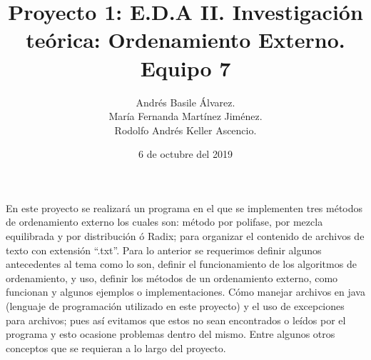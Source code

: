 \documentclass[12pt,letterpaper]{report}
\author{Andrés Basile Álvarez.\\María Fernanda Martínez Jiménez.\\Rodolfo Andrés Keller Ascencio.}
\title{Proyecto 1: E.D.A II.
Investigación teórica: Ordenamiento Externo. Equipo 7}
\date{6 de octubre del 2019}
\begin{document}
\maketitle
En este proyecto se realizará un programa en el que se implementen tres métodos de ordenamiento externo los cuales son: método por polifase, por mezcla equilibrada y por distribución ó Radix; para organizar el contenido de archivos de texto con extensión “.txt”.  
Para lo anterior se requerimos definir algunos antecedentes al tema como lo son, definir el funcionamiento de los algoritmos de ordenamiento, y uso, definir los métodos de un ordenamiento externo, como funcionan y algunos ejemplos o implementaciones. Cómo manejar archivos en java (lenguaje de programación utilizado en este proyecto) y el uso de excepciones para archivos; pues así evitamos que estos no sean encontrados o leídos por el programa y esto ocasione problemas dentro del mismo.
Entre algunos otros conceptos que se requieran a lo largo del proyecto.
\\\\
\end{document}
